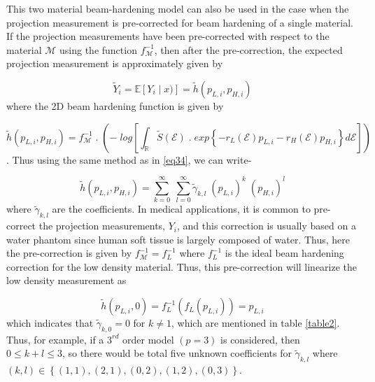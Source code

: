 This two material beam-hardening model can also be used in the case when the projection measurement is pre-corrected for beam hardening of a single material. If the projection measurements have been pre-corrected with respect to the material $\mathcal{M}$ using the function $f_{\mathcal{M}}^{-1}$, then after the pre-correction, the expected projection measurement is approximately given by

\begin{equation}
\label{eq35}
\widetilde{Y}_{i} = \mathbb{E} \left[ Y_i\mid x) \right] = \widetilde{h} \left( p_{L,i} , p_{H,i} \right)
\end{equation} where the 2D beam hardening function is given by

\begin{equation}
\label{eq36}
\widetilde{h} \left( p_{L,i} , p_{H,i} \right) = f_{\mathcal{M}}^{-1} \; . \;\left(- \; log \left[ \int_{\mathbb{R}} \widetilde{S}(\mathcal{E}) \; . \; exp \left\lbrace - r_L(\mathcal{E}) p_{L,i} - r_H(\mathcal{E}) p_{H,i} \right\rbrace d\mathcal{E}  \right] \right)
\end{equation}. Thus using the same method as in \ref{eq34}, we can write-

\begin{equation}
\label{eq37}
\widetilde{h} \left( p_{L,i} , p_{H,i} \right) = \sum\limits_{k=0}^\infty \; \sum\limits_{l=0}^\infty \widetilde{\gamma}_{k,l} \; \left(p_{L,i}\right)^{k} \; \left(p_{H,i}\right)^{l}
\end{equation} where $\widetilde{\gamma}_{k,l}$ are the coefficients. In medical applications, it is common to pre-correct the projection measurements, $Y_i$, and this correction is usually based on a water phantom since human soft tissue is largely composed of water. Thus, here the pre-correction is given by $f_{\mathcal{M}}^{-1} = f_{L}^{-1}$ where $f_{L}^{-1}$ is the ideal beam hardening correction for the low density material. Thus, this pre-correction will linearize the low density measurement as

\begin{equation}
\label{eq38}
\widetilde{h} \left( p_{L,i} , 0 \right) =  f_{L}^{-1} \left( f_{L} (p_{L,i}) \right) = p_{L,i}
\end{equation} which indicates that $\widetilde\gamma_{k,0} = 0$ for $k \neq 1$, which are mentioned in table \ref{table2}. Thus, for example, if a $3^{rd}$ order model $(p = 3)$ is considered, then $0 \leq k+l \leq 3$, so there would be total five unknown coefficients for $\widetilde\gamma_{k,l}$ where $(k , l) \in \left\lbrace (1 , 1), (2 , 1), (0 , 2), (1 , 2), (0 , 3) \right\rbrace $.

